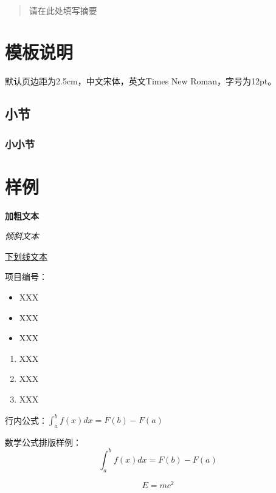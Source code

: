 \documentclass[12pt,hyperref,a4paper,UTF8]{ctexart}
\begin{document}
\cover\
\thispagestyle{empty}%

\begin{abstract}
    请在此处填写摘要
\end{abstract}


\newpage
\tableofcontents

\newpage

\section{模板说明}
默认页边距为2.5cm，中文宋体，英文Times New Roman，字号为12pt。
\subsection{小节}
\subsubsection{小小节}
\section{样例}
\textbf{加粗文本}

\textit{倾斜文本}

\underline{下划线文本}

项目编号：

\begin{itemize}
    \item XXX
    \item XXX
    \item XXX
\end{itemize}

\begin{enumerate}
    \item XXX
    \item XXX
    \item XXX
\end{enumerate}

行内公式：$\int_a^b f(x)dx = F(b)-F(a)$

数学公式排版样例：
\begin{equation}\label{eq:1}
    \int_a^b f(x)dx = F(b)-F(a)
\end{equation}

\begin{equation}\label{eq:2}
    E = mc^2
\end{equation}
\end{document}
